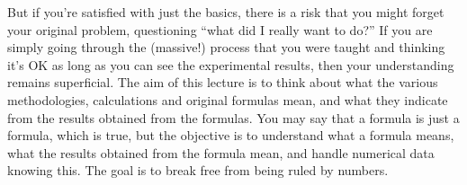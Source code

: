 \documentclass{ltjsbook}
\begin{document}
But if you're satisfied with just the basics, there is a risk that you might forget your original problem, questioning “what did I really want to do?” If you are simply going through the (massive!) process that you were taught and thinking it's OK as long as you can see the experimental results, then your understanding remains superficial. The aim of this lecture is to think about what the various methodologies, calculations and original formulas mean, and what they indicate from the results obtained from the formulas. You may say that a formula is just a formula, which is true, but the objective is to understand what a formula means, what the results obtained from the formula mean, and handle numerical data knowing this. The goal is to break free from being ruled by numbers.
\end{document}
